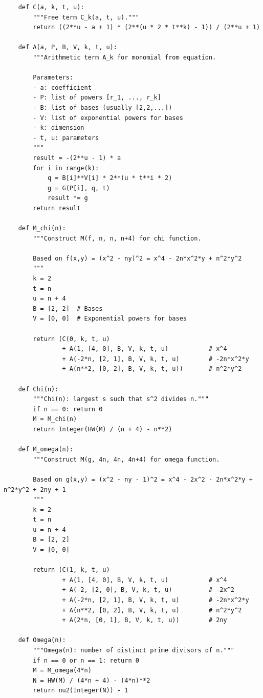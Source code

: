 \documentclass[10pt]{article}
\theoremstyle{plain}
\begin{document}
{\begin{verbatim}
    def C(a, k, t, u):
        """Free term C_k(a, t, u)."""
        return ((2**u - a + 1) * (2**(u * 2 * t**k) - 1)) / (2**u + 1)
    
    def A(a, P, B, V, k, t, u):
        """Arithmetic term A_k for monomial from equation.
        
        Parameters:
        - a: coefficient
        - P: list of powers [r_1, ..., r_k]
        - B: list of bases (usually [2,2,...])
        - V: list of exponential powers for bases
        - k: dimension
        - t, u: parameters
        """
        result = -(2**u - 1) * a
        for i in range(k):
            q = B[i]**V[i] * 2**(u * t**i * 2)
            g = G(P[i], q, t)
            result *= g
        return result
    
    def M_chi(n):
        """Construct M(f, n, n, n+4) for chi function.
        
        Based on f(x,y) = (x^2 - ny)^2 = x^4 - 2n*x^2*y + n^2*y^2
        """
        k = 2
        t = n
        u = n + 4
        B = [2, 2]  # Bases
        V = [0, 0]  # Exponential powers for bases
        
        return (C(0, k, t, u)
                + A(1, [4, 0], B, V, k, t, u)           # x^4
                + A(-2*n, [2, 1], B, V, k, t, u)        # -2n*x^2*y
                + A(n**2, [0, 2], B, V, k, t, u))       # n^2*y^2
    
    def Chi(n):
        """Chi(n): largest s such that s^2 divides n."""
        if n == 0: return 0
        M = M_chi(n)
        return Integer(HW(M) / (n + 4) - n**2)
    
    def M_omega(n):
        """Construct M(g, 4n, 4n, 4n+4) for omega function.
        
        Based on g(x,y) = (x^2 - ny - 1)^2 = x^4 - 2x^2 - 2n*x^2*y + n^2*y^2 + 2ny + 1
        """
        k = 2
        t = n
        u = n + 4
        B = [2, 2]
        V = [0, 0]
        
        return (C(1, k, t, u)
                + A(1, [4, 0], B, V, k, t, u)           # x^4
                + A(-2, [2, 0], B, V, k, t, u)          # -2x^2
                + A(-2*n, [2, 1], B, V, k, t, u)        # -2n*x^2*y
                + A(n**2, [0, 2], B, V, k, t, u)        # n^2*y^2
                + A(2*n, [0, 1], B, V, k, t, u))        # 2ny
    
    def Omega(n):
        """Omega(n): number of distinct prime divisors of n."""
        if n == 0 or n == 1: return 0
        M = M_omega(4*n)
        N = HW(M) / (4*n + 4) - (4*n)**2
        return nu2(Integer(N)) - 1
    

\end{verbatim}}
\end{document}
